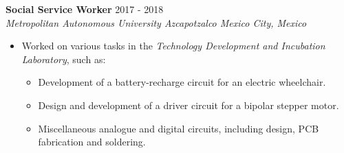 \documentclass[10pt]{article}
\begin{document}
	\vspace{3em}

	\noindent
	\textbf{Social Service Worker}
			\hfill 2017 - 2018 \\
	\textit{Metropolitan Autonomous University Azcapotzalco
			\hfill Mexico City, Mexico}

	\vspace{2em}

	\begin{minipage}{5.5in}
		\begin{itemize}
			\item Worked on various tasks in the \emph{Technology Development
				and Incubation Laboratory}, such as:

				\begin{itemize}
					\item Development of a battery-recharge circuit for an
						electric wheelchair.

					\item Design and development of a driver circuit for a
						bipolar stepper motor.

					\item Miscellaneous analogue and digital circuits, including
						design, PCB fabrication and soldering.
				\end{itemize}
		\end{itemize}
	\end{minipage}

	\newpage
\end{document}
